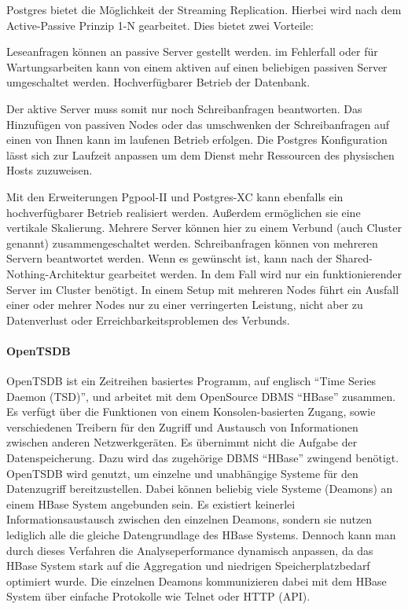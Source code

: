 Postgres bietet die Möglichkeit der \gls{Streaming Replication}. Hierbei wird
nach dem \gls{Active-Passive Prinzip} 1-N gearbeitet. Dies bietet zwei
Vorteile:

\begin{outline}
  \1 Leseanfragen können an passive Server gestellt werden.
  \1 im Fehlerfall oder für Wartungsarbeiten kann von einem aktiven auf einen
  beliebigen passiven Server umgeschaltet werden.
  \1 Hochverfügbarer Betrieb der Datenbank.
\end{outline}

Der aktive Server muss somit nur noch Schreibanfragen beantworten. Das
Hinzufügen von passiven Nodes oder das umschwenken der Schreibanfragen auf
einen von Ihnen kann im laufenen Betrieb erfolgen. Die Postgres Konfiguration
lässt sich zur Laufzeit anpassen um dem Dienst mehr Ressourcen des physischen
Hosts zuzuweisen.

Mit den Erweiterungen \gls{Pgpool-II} und \gls{Postgres-XC} kann ebenfalls ein
hochverfügbarer Betrieb realisiert werden. Außerdem ermöglichen sie eine
vertikale \gls{Skalierung}. Mehrere Server können hier zu einem Verbund (auch
Cluster genannt) zusammengeschaltet werden. Schreibanfragen können von mehreren
Servern beantwortet werden. Wenn es gewünscht ist, kann nach der
\gls{Shared-Nothing-Architektur} gearbeitet werden. In dem Fall wird nur ein
funktionierender Server im Cluster benötigt. In einem Setup mit mehreren Nodes
führt ein Ausfall einer oder mehrer Nodes nur zu einer verringerten Leistung,
nicht aber zu Datenverlust oder Erreichbarkeitsproblemen des Verbunds.
\tm%

\paragraph{OpenTSDB}
\label{paragraph:opentsdb}
OpenTSDB ist ein Zeitreihen basiertes Programm, auf englisch ``Time Series
Daemon (TSD)'', und arbeitet mit dem OpenSource \gls{DBMS} ``HBase'' zusammen.
Es verfügt über die Funktionen von einem Konsolen-basierten Zugang, sowie
verschiedenen Treibern für den Zugriff und Austausch von Informationen zwischen
anderen Netzwerkgeräten. Es übernimmt nicht die Aufgabe der Datenspeicherung.
Dazu wird das zugehörige \gls{DBMS} ``HBase'' zwingend benötigt. OpenTSDB wird
genutzt, um einzelne und unabhängige Systeme für den Datenzugriff
bereitzustellen. Dabei können beliebig viele Systeme (Deamons) an einem HBase
System angebunden sein. Es existiert keinerlei Informationsaustausch zwischen
den einzelnen Deamons, sondern sie nutzen lediglich alle die gleiche
Datengrundlage des HBase Systems. Dennoch kann man durch dieses Verfahren
die Analyseperformance dynamisch anpassen, da das HBase System stark auf die
Aggregation und niedrigen Speicherplatzbedarf optimiert wurde. Die einzelnen
Deamons kommunizieren dabei mit dem HBase System über einfache Protokolle wie
Telnet oder HTTP (API).

